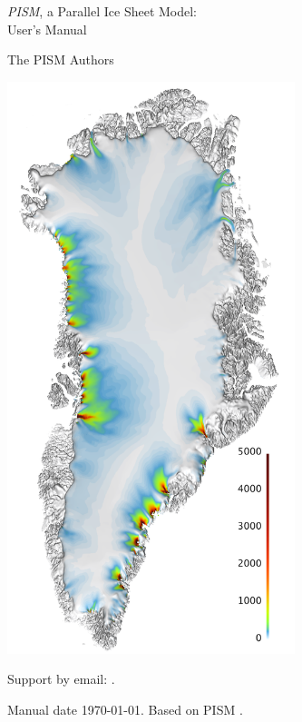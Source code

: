\documentclass[titlepage,letterpaper,final]{scrartcl}
\begin{document}
\graphicspath{{figs/}}

\begin{titlepage}

  \begin{center}
    {\huge{} \emph{PISM}, a Parallel Ice Sheet Model:\\\medskip User's Manual}
    \vspace{0.5cm}

    {\Large The PISM Authors}
    \vspace{1cm}

    \includegraphics[width=3.3in,keepaspectratio=true]{grn-1km-csurf}
    \vfill

    \small Support by email: \PISMEMAIL.
    \medskip

    Manual date \today. Based on PISM \PISMREV.
    \medskip

    \PISMDOWNLOADMSG
  \end{center}
\end{titlepage}

\newpage
\phantom{bob}
\end{document}
